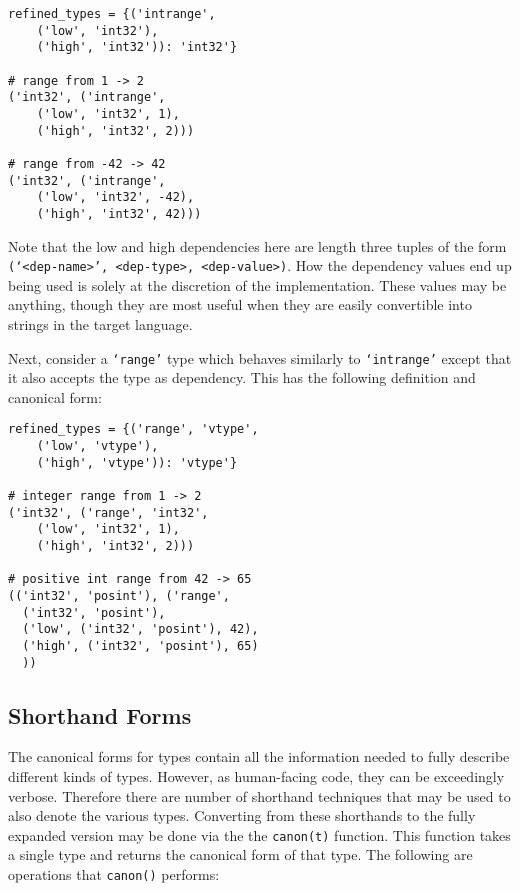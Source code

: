 \documentclass{ansconfpaper}
\newcommand{\vin}[1]{\texttt{{#1}}}
\begin{document}
\begin{lstlisting}
refined_types = {('intrange', 
    ('low', 'int32'), 
    ('high', 'int32')): 'int32'}

# range from 1 -> 2
('int32', ('intrange', 
    ('low', 'int32', 1), 
    ('high', 'int32', 2)))

# range from -42 -> 42
('int32', ('intrange', 
    ('low', 'int32', -42), 
    ('high', 'int32', 42)))
\end{lstlisting}
Note that the low and high dependencies here are length three tuples of the form
\vin{(`<dep-name>', <dep-type>, <dep-value>)}.  How the dependency values end up 
being used is solely at the discretion of the implementation.  These values may
be anything, though they are most useful when they are easily convertible into 
strings in the target language.

Next, consider a \vin{`range'} type which behaves similarly to \vin{`intrange'} 
except that it also accepts the type as dependency.  This has the following 
definition and canonical form:
\begin{lstlisting}
refined_types = {('range', 'vtype', 
    ('low', 'vtype'), 
    ('high', 'vtype')): 'vtype'}
    
# integer range from 1 -> 2
('int32', ('range', 'int32', 
    ('low', 'int32', 1), 
    ('high', 'int32', 2)))    

# positive int range from 42 -> 65
(('int32', 'posint'), ('range', 
  ('int32', 'posint'),
  ('low', ('int32', 'posint'), 42),
  ('high', ('int32', 'posint'), 65)
  ))
\end{lstlisting}

\subsection{Shorthand Forms}
\label{sec:shorhand}

The canonical forms for types contain all the information needed to fully describe
different kinds of types.  However, as human-facing code, they can be exceedingly 
verbose.  Therefore there are number of shorthand techniques that may be used to 
also denote the various types.  Converting from these shorthands to the fully
expanded version may be done via the the \vin{canon(t)} function.  This function
takes a single type and returns the canonical form of that type.  The following
are operations that \vin{canon()}  performs:
\end{document}
